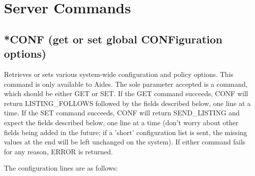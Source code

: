 \section{Server Commands}



\subsection{*CONF (get or set global CONFiguration options)}

 Retrieves or sets various system-wide configuration and policy options.  This
command is only available to Aides.  The sole parameter accepted is a command,
which should be either GET or SET.  If the GET command succeeds, CONF will
return LISTING_FOLLOWS followed by the fields described below, one line at a
time.  If the SET command succeeds, CONF will return SEND_LISTING and expect
the fields described below, one line at a time (don't worry about other fields
being added in the future; if a 'short' configuration list is sent, the missing
values at the end will be left unchanged on the system).  If either command
fails for any reason, ERROR is returned.

 The configuration lines are as follows:

